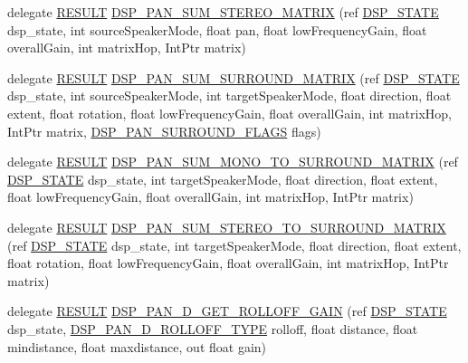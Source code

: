 \begin{DoxyCompactItemize}
\item 
delegate \hyperlink{namespace_f_m_o_d_a305d1176ef3f8c8815861a60407ac33d}{R\+E\+S\+U\+LT} \hyperlink{namespace_f_m_o_d_ac397f0f8014a6625c3810a9af4b4b9e7}{D\+S\+P\+\_\+\+P\+A\+N\+\_\+\+S\+U\+M\+\_\+\+S\+T\+E\+R\+E\+O\+\_\+\+M\+A\+T\+R\+IX} (ref \hyperlink{struct_f_m_o_d_1_1_d_s_p___s_t_a_t_e}{D\+S\+P\+\_\+\+S\+T\+A\+TE} dsp\+\_\+state, int source\+Speaker\+Mode, float pan, float low\+Frequency\+Gain, float overall\+Gain, int matrix\+Hop, Int\+Ptr matrix)
\item 
delegate \hyperlink{namespace_f_m_o_d_a305d1176ef3f8c8815861a60407ac33d}{R\+E\+S\+U\+LT} \hyperlink{namespace_f_m_o_d_a9dda121ba9ef7b93f94aae821fafc709}{D\+S\+P\+\_\+\+P\+A\+N\+\_\+\+S\+U\+M\+\_\+\+S\+U\+R\+R\+O\+U\+N\+D\+\_\+\+M\+A\+T\+R\+IX} (ref \hyperlink{struct_f_m_o_d_1_1_d_s_p___s_t_a_t_e}{D\+S\+P\+\_\+\+S\+T\+A\+TE} dsp\+\_\+state, int source\+Speaker\+Mode, int target\+Speaker\+Mode, float direction, float extent, float rotation, float low\+Frequency\+Gain, float overall\+Gain, int matrix\+Hop, Int\+Ptr matrix, \hyperlink{namespace_f_m_o_d_a261a23e0e5c15d202fa47817d62b512c}{D\+S\+P\+\_\+\+P\+A\+N\+\_\+\+S\+U\+R\+R\+O\+U\+N\+D\+\_\+\+F\+L\+A\+GS} flags)
\item 
delegate \hyperlink{namespace_f_m_o_d_a305d1176ef3f8c8815861a60407ac33d}{R\+E\+S\+U\+LT} \hyperlink{namespace_f_m_o_d_a85ae3625db22d49858de03963b6fa9e2}{D\+S\+P\+\_\+\+P\+A\+N\+\_\+\+S\+U\+M\+\_\+\+M\+O\+N\+O\+\_\+\+T\+O\+\_\+\+S\+U\+R\+R\+O\+U\+N\+D\+\_\+\+M\+A\+T\+R\+IX} (ref \hyperlink{struct_f_m_o_d_1_1_d_s_p___s_t_a_t_e}{D\+S\+P\+\_\+\+S\+T\+A\+TE} dsp\+\_\+state, int target\+Speaker\+Mode, float direction, float extent, float low\+Frequency\+Gain, float overall\+Gain, int matrix\+Hop, Int\+Ptr matrix)
\item 
delegate \hyperlink{namespace_f_m_o_d_a305d1176ef3f8c8815861a60407ac33d}{R\+E\+S\+U\+LT} \hyperlink{namespace_f_m_o_d_a552eb6c162f571ad693744be6349786a}{D\+S\+P\+\_\+\+P\+A\+N\+\_\+\+S\+U\+M\+\_\+\+S\+T\+E\+R\+E\+O\+\_\+\+T\+O\+\_\+\+S\+U\+R\+R\+O\+U\+N\+D\+\_\+\+M\+A\+T\+R\+IX} (ref \hyperlink{struct_f_m_o_d_1_1_d_s_p___s_t_a_t_e}{D\+S\+P\+\_\+\+S\+T\+A\+TE} dsp\+\_\+state, int target\+Speaker\+Mode, float direction, float extent, float rotation, float low\+Frequency\+Gain, float overall\+Gain, int matrix\+Hop, Int\+Ptr matrix)
\item 
delegate \hyperlink{namespace_f_m_o_d_a305d1176ef3f8c8815861a60407ac33d}{R\+E\+S\+U\+LT} \hyperlink{namespace_f_m_o_d_a04006b2279f2b4620e287a94e50ed6c8}{D\+S\+P\+\_\+\+P\+A\+N\+\_\+D\+\_\+\+G\+E\+T\+\_\+\+R\+O\+L\+L\+O\+F\+F\+\_\+\+G\+A\+IN} (ref \hyperlink{struct_f_m_o_d_1_1_d_s_p___s_t_a_t_e}{D\+S\+P\+\_\+\+S\+T\+A\+TE} dsp\+\_\+state, \hyperlink{namespace_f_m_o_d_aa8ce9494873e368660d4bf12f0330290}{D\+S\+P\+\_\+\+P\+A\+N\+\_\+D\+\_\+\+R\+O\+L\+L\+O\+F\+F\+\_\+\+T\+Y\+PE} rolloff, float distance, float mindistance, float maxdistance, out float gain)

\end{DoxyCompactItemize}
